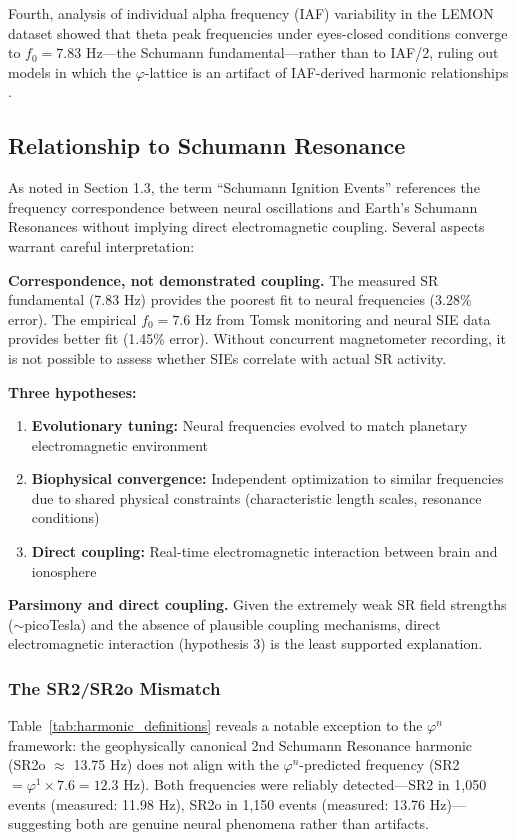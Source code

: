 \documentclass[11pt,a4paper]{article}
\newcommand{\phisym}{\varphi}
\begin{document}
Fourth, analysis of individual alpha frequency (IAF) variability in the LEMON dataset showed that theta peak frequencies under eyes-closed conditions converge to $f_0 = 7.83$ Hz---the Schumann fundamental---rather than to IAF/2, ruling out models in which the $\phisym$-lattice is an artifact of IAF-derived harmonic relationships \parencite{lacy2026lemon}.

\subsection{Relationship to Schumann Resonance}

As noted in Section 1.3, the term ``Schumann Ignition Events'' references the frequency correspondence between neural oscillations and Earth's Schumann Resonances without implying direct electromagnetic coupling. Several aspects warrant careful interpretation:

\textbf{Correspondence, not demonstrated coupling.} The measured SR fundamental (7.83 Hz) provides the poorest fit to neural frequencies (3.28\% error). The empirical $f_0 = 7.6$ Hz from Tomsk monitoring and neural SIE data provides better fit (1.45\% error). Without concurrent magnetometer recording, it is not possible to assess whether SIEs correlate with actual SR activity.

\textbf{Three hypotheses:}
\begin{enumerate}
    \item \textbf{Evolutionary tuning:} Neural frequencies evolved to match planetary electromagnetic environment
    \item \textbf{Biophysical convergence:} Independent optimization to similar frequencies due to shared physical constraints (characteristic length scales, resonance conditions)
    \item \textbf{Direct coupling:} Real-time electromagnetic interaction between brain and ionosphere
\end{enumerate}

\textbf{Parsimony and direct coupling.} Given the extremely weak SR field strengths ($\sim$picoTesla) and the absence of plausible coupling mechanisms, direct electromagnetic interaction (hypothesis 3) is the least supported explanation.

\subsubsection{The SR2/SR2o Mismatch}

Table~\ref{tab:harmonic_definitions} reveals a notable exception to the $\phisym^n$ framework: the geophysically canonical 2nd Schumann Resonance harmonic (SR2o $\approx$ 13.75 Hz) does not align with the $\phisym^n$-predicted frequency (SR2 $= \phisym^1 \times 7.6 = 12.3$ Hz). Both frequencies were reliably detected---SR2 in 1,050 events (measured: 11.98 Hz), SR2o in 1,150 events (measured: 13.76 Hz)---suggesting both are genuine neural phenomena rather than artifacts.
\end{document}
